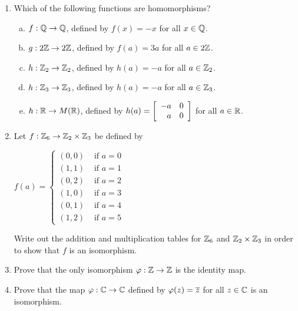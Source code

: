 \documentclass[11pt,fleqn,dvipsnames,usenames]{article}
\newcommand{\p}{\noindent}
\begin{document}
\p {\huge \S4.6 Problems}
\vsp

\begin{enumerate}
\item Which of the following functions are homomorphisms?
\begin{enumerate}[(a)]
\item $f:\Q\to\Q$, defined by $f(x) = -x$ for all $x\in \Q$.
\item $g:2\Z\to2\Z$, defined by $f(a) = 3a$ for all $a\in2\Z$.
\item $h:\Z_2\to\Z_2$, defined by $h(a) = -a$ for all $a\in\Z_2$.
\item $h:\Z_3\to\Z_3$, defined by $h(a) = -a$ for all $a\in\Z_3$.
\item $h:\R\to M(\R)$, defined by $h(a) = \MATRIX{rr}{-a & 0\\a & 0}$ for all $a\in\R$.
\end{enumerate}
\item Let $f:\Z_6\to\Z_2\times\Z_3$ be defined by
\begin{center}
$f(a) = \begin{cases}(0,0) & \text{ if }a = 0\\(1,1) & \text{ if }a=1\\(0,2) & \text{ if }a=2\\(1,0) & \text{ if }a=3\\(0,1) & \text{ if }a=4\\(1,2) & \text{ if }a=5\end{cases}$
\end{center}
Write out the addition and multiplication tables for $\Z_6$ and $\Z_2\times \Z_3$ in order to show that $f$ is an isomorphism.
\item Prove that the only isomorphism $\varphi:\Z \to \Z$ is the identity map.
\item Prove that the map $\varphi:\C\to\C$ defined by $\varphi(z) = \CC{z}$ for all $z\in \C$ is an isomorphism.
\end{enumerate}
\end{document}
